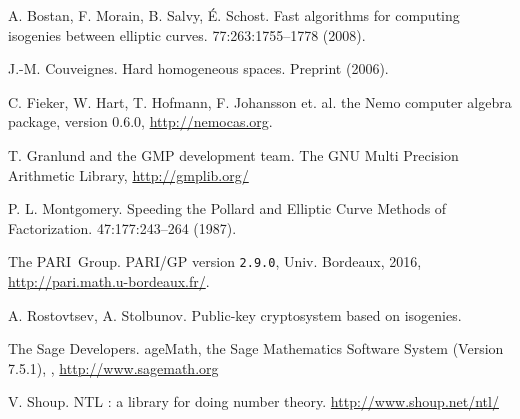 \documentclass[12pt]{article}
\begin{document}
\begin{thebibliography}{99}

A. Bostan, F. Morain, B. Salvy, \'E. Schost.
\newblock Fast algorithms for computing isogenies between elliptic curves.
 77:263:1755--1778 (2008).

J.-M. Couveignes.
\newblock Hard homogeneous spaces.
\newblock Preprint (2006).

C. Fieker, W. Hart, T. Hofmann, F. Johansson et. al.
\newblock the Nemo computer algebra package, version 0.6.0, \url{http://nemocas.org}.

T. Granlund and the GMP development team.
\newblock The GNU Multi Precision Arithmetic Library, \url{http://gmplib.org/}

P. L. Montgomery.
\newblock Speeding the Pollard and Elliptic Curve Methods of Factorization.
 47:177:243--264 (1987).

The PARI~Group.
\newblock PARI/GP version {\tt 2.9.0}, Univ. Bordeaux, 2016, \url{http://pari.math.u-bordeaux.fr/}.

A. Rostovtsev, A. Stolbunov.
\newblock Public-key cryptosystem based on isogenies.

The Sage Developers.
ageMath, the {S}age {M}athematics {S}oftware {S}ystem ({V}ersion
  7.5.1),
, \url{http://www.sagemath.org}

V. Shoup.
\newblock NTL : a library for doing number theory.
\newblock \url{http://www.shoup.net/ntl/}





\end{thebibliography}
\end{document}
